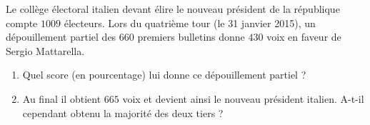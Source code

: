 
\begin{exercice}\label{exo2smath-0127}

    Le collège électoral italien devant élire le nouveau président de la république compte \( 1009\) électeurs. Lors du quatrième tour (le 31 janvier 2015), un dépouillement partiel des \( 660\) premiers bulletins donne \( 430\) voix en faveur de Sergio Mattarella.
    \begin{enumerate}
        \item
            Quel score (en pourcentage) lui donne ce dépouillement partiel ?
        \item
            Au final il obtient \( 665\) voix et devient ainsi le nouveau président italien. A-t-il cependant obtenu la majorité des deux tiers ?
    \end{enumerate}

\end{exercice}
